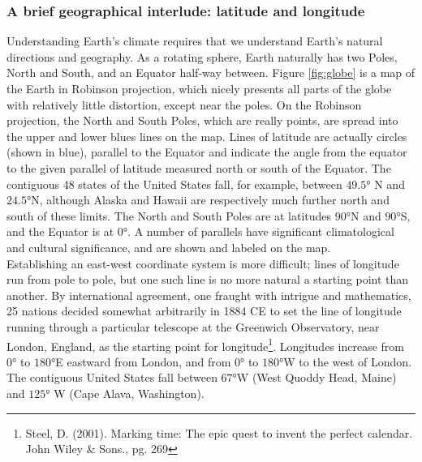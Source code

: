 \subsubsection{A brief geographical interlude: latitude and longitude}
Understanding Earth's climate requires that we understand Earth's natural directions and geography. As a rotating sphere, Earth naturally has two Poles, North and South, and an Equator half-way between. Figure \ref{fig:globe} is a map of the Earth in Robinson projection, which nicely presents all parts of the globe with relatively little distortion, except near the poles. On the Robinson projection, the North and South Poles, which are really points, are spread into the upper and lower blues lines on the map. Lines of latitude are actually circles (shown in blue), parallel to the Equator and indicate the angle from the equator to the given parallel of latitude measured north or south of the Equator. The contiguous 48 states of the United States fall, for example, between $\ang{49.5}$ N and $\ang{24.5}$N, although Alaska and Hawaii are respectively much further north and south of these limits. The North and South Poles are at latitudes $\ang{90}$N and $\ang{90}$S, and the Equator is at $\ang{0}$. A number of parallels have significant climatological and cultural significance, and are shown and labeled on the map. \\
Establishing an east-west coordinate system is more difficult; lines of longitude run from pole to pole, but one such line is no more natural a starting point than another. By international agreement, one fraught with intrigue and mathematics, 25 nations decided somewhat arbitrarily in 1884 CE to set the line of longitude running through a particular telescope at the Greenwich Observatory, near London, England, as the starting point for longitude\footnote{Steel, D. (2001). Marking time: The epic quest to invent the perfect calendar. John Wiley \& Sons., pg. 269}. Longitudes increase from $\ang{0}$ to $\ang{180}$E eastward from London, and from $\ang{0}$ to $\ang{180}$W to the west of London. The contiguous United States fall between $\ang{67}$W (West Quoddy Head, Maine) and $\ang{125}$ W (Cape Alava, Washington).\\
